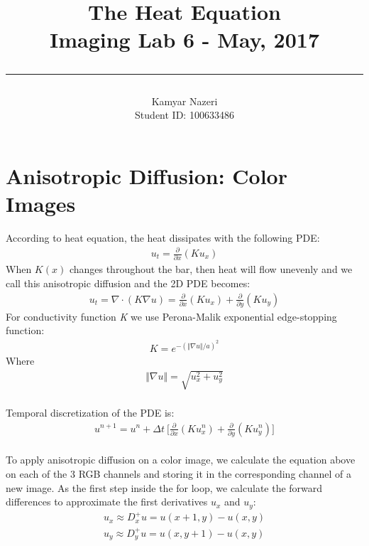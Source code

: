 \documentclass[a4paper,11pt]{article}
\begin{document}
\title{
	\Huge \textbf {The Heat Equation}
    \\ [0.2cm]
	\LARGE Imaging Lab 6 - May, 2017
    \\ [0.5cm]
    \hrule
}

\date{}

\author{
		\Large Kamyar Nazeri \\
		\large Student ID: 100633486 }

\maketitle
\newpage

\section*{Anisotropic Diffusion: Color Images}
According to heat equation, the heat dissipates with the following PDE:
\begin{align*}
u_t = \frac{\partial}{\partial x}(K u_x)
\end{align*}
When $K(x)$ changes throughout the bar, then heat will flow unevenly and we call this anisotropic diffusion and the 2D PDE becomes:
\begin{align*}
u_t = \nabla \cdot (K \nabla u) = \frac{\partial}{\partial x}(K u_x) + \frac{\partial}{\partial y}(K u_y)
\end{align*}
For conductivity function \emph{K} we use Perona-Malik exponential edge-stopping function:
\begin{align*}
K = e^{-(\Vert\nabla u\Vert/a)^2}
\end{align*}
Where 
\begin{align*}
\Vert\nabla u\Vert = \sqrt{u_x^2 + u_y^2}
\end{align*}
\\Temporal discretization of the PDE is:
\begin{align*}
u^{n+1} = u^n + \Delta t\ \big[\frac{\partial}{\partial x}(K u_x^n) + \frac{\partial}{\partial y}(K u_y^n)\big]
\end{align*}
 \\
To apply anisotropic diffusion on a color image, we calculate the equation above on each of the 3 RGB channels and storing it in the corresponding channel of a new image. As the first step inside the for loop, we calculate the forward differences to approximate the first
derivatives $u_x$ and $u_y$: 
\begin{align*}
u_x \approx D_x^{+}u = u(x+1,y)-u(x,y) \\
u_y \approx D_y^{+}u = u(x,y+1)-u(x,y) \\
\end{align*}
\end{document}

